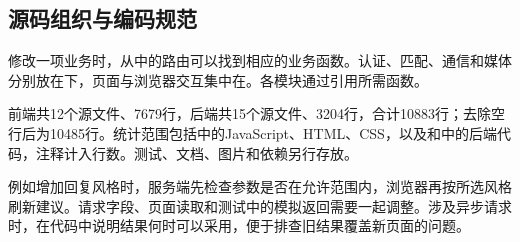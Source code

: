 \subsection*{源码组织与编码规范}
修改一项业务时，从中的路由可以找到相应的业务函数。认证、匹配、通信和媒体分别放在下，页面与浏览器交互集中在。各模块通过引用所需函数。

前端共12个源文件、7679行，后端共15个源文件、3204行，合计10883行；去除空行后为10485行。统计范围包括中的JavaScript、HTML、CSS，以及和中的后端代码，注释计入行数。测试、文档、图片和依赖另行存放。

例如增加回复风格时，服务端先检查参数是否在允许范围内，浏览器再按所选风格刷新建议。请求字段、页面读取和测试中的模拟返回需要一起调整。涉及异步请求时，在代码中说明结果何时可以采用，便于排查旧结果覆盖新页面的问题。

